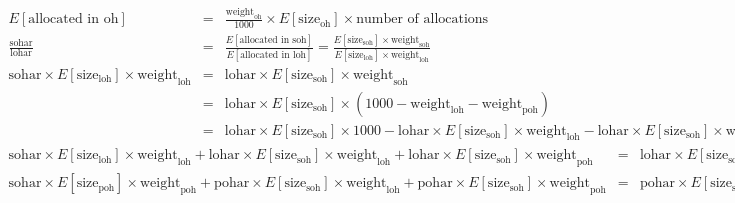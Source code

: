   \begin{eqnarray*}
                                                                       E[\text{allocated in oh}] &=& \frac{\text{weight}_{\text{oh}}}{1000} \times E[\text{size}_{\text{oh}}] \times \text{number of allocations}                                                                                                                        \\
                                                               \frac{\text{sohar}}{\text{lohar}} &=& \frac{E[\text{allocated in soh}]}{E[\text{allocated in loh}]} = \frac{E[\text{size}_{\text{soh}}] \times \text{weight}_{\text{soh}}}{E[\text{size}_{\text{loh}}] \times \text{weight}_{\text{loh}} }                                \\
    \text{sohar} \times E[\text{size}_{\text{loh}}] \times \text{weight}_{\text{loh}} &=& \text{lohar} \times E[\text{size}_{\text{soh}}] \times \text{weight}_{\text{soh}}                                                                                                                                                              \\
                                                                                                 &=& \text{lohar} \times E[\text{size}_{\text{soh}}] \times (1000 - \text{weight}_{\text{loh}} - \text{weight}_{\text{poh}})                                                                                                             \\
                                                                                                 &=& \text{lohar} \times E[\text{size}_{\text{soh}}] \times 1000 - \text{lohar} \times E[\text{size}_{\text{soh}}] \times \text{weight}_{\text{loh}} - \text{lohar} \times E[\text{size}_{\text{soh}}] \times \text{weight}_{\text{poh}}
  \end{eqnarray*}
  \begin{eqnarray*}
    \text{sohar} \times E[\text{size}_{\text{loh}}] \times \text{weight}_{\text{loh}} + \text{lohar} \times E[\text{size}_{\text{soh}}] \times \text{weight}_{\text{loh}} + \text{lohar} \times E[\text{size}_{\text{soh}}] \times \text{weight}_{\text{poh}} &=& \text{lohar} \times E[\text{size}_{\text{soh}}] \times 1000 \\
    \text{sohar} \times E[\text{size}_{\text{poh}}] \times \text{weight}_{\text{poh}} + \text{pohar} \times E[\text{size}_{\text{soh}}] \times \text{weight}_{\text{loh}} + \text{pohar} \times E[\text{size}_{\text{soh}}] \times \text{weight}_{\text{poh}} &=& \text{pohar} \times E[\text{size}_{\text{soh}}] \times 1000
  \end{eqnarray*}

